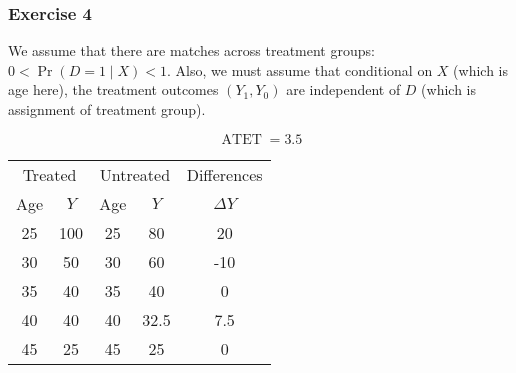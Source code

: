 {{\subsubsection*{Exercise 4}

\begin{enumerate}[label=(\arabic*)]
{\item 
We assume that there are matches across treatment groups: $0<\operatorname{Pr}(D=1 \mid X)<1$. Also, we must assume that conditional on $X$ (which is age here), the treatment outcomes $\left(Y_{1}, Y_{0}\right)$ are independent of $D$ (which is assignment of treatment group).
}
{\item 

$$
\operatorname{ATET} = 3.5
$$

\begin{table}[!htp]
    \centering
    \begin{tabular}{cc|cc|c}
        \multicolumn{2}{c}{Treated} & \multicolumn{2}{c}{Untreated}  & Differences \\
        Age & $Y$ & Age & $Y$ & $\Delta Y$\\ \hline
        25 & 100 & 25 & 80 & 20\\
        30 & 50 & 30 & 60 & -10\\
        35 & 40 & 35 & 40 & 0\\
        40 & 40 & 40 & 32.5 & 7.5\\
        45 & 25 & 45 & 25 & 0\\
    \end{tabular}
\end{table}
}
\end{enumerate}
}
}
